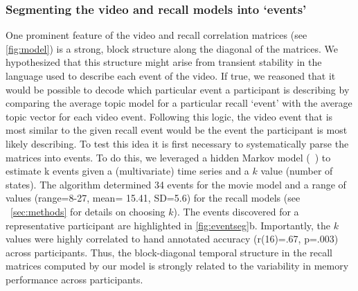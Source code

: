 \documentclass{article}
\begin{document}
{%

\subsubsection{Segmenting the video and recall models into `events'}
One prominent feature of the video and recall correlation matrices (see \ref{fig:model}) is a strong, block structure along the diagonal of the matrices.  We hypothesized that this structure might arise from transient stability in the language used to describe each event of the video. If true, we reasoned that it would be possible to decode which particular event a participant is describing by comparing the average topic model for a particular recall `event' with the average topic vector for each video event. Following this logic, the video event that is most similar to the given recall event would be the event the participant is most likely describing.  To test this idea it is first necessary to systematically parse the matrices into events.  To do this, we leveraged a hidden Markov model (~\citep{BaldEtal17}) to estimate k events given a (multivariate) time series and a $k$ value (number of states). The algorithm determined 34 events for the movie model and a range of values (range=8-27, mean= 15.41, SD=5.6) for the recall models (see ~\ref{sec:methods} for details on choosing $k$).  The events discovered for a representative participant are highlighted in \ref{fig:eventseg}b. Importantly, the $k$ values were highly correlated to hand annotated accuracy (r(16)=.67, p=.003) across participants. Thus, the block-diagonal temporal structure in the recall matrices computed by our model is strongly related to the variability in memory performance across participants.

}
\end{document}
